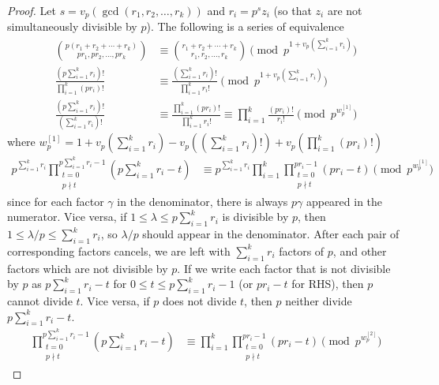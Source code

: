 \documentclass{treatise}
\begin{document}
\begin{proof}
Let $s = v_p (\gcd(r_1, r_2, \hdots, r_k))$ and $r_i = p^s z_i$ (so that $z_i$ are not simultaneously divisible by $p$). The following is a series of equivalence
\begin{align*}
{p(r_1 + r_2 + \cdots + r_k) \choose p r_1, p r_2, \hdots, p r_k} & \equiv {r_1 + r_2 + \cdots + r_k \choose r_1, r_2, \hdots, r_k} \pmod{p^{1 + v_p \left( \sum_{i = 1}^k r_i \right)}}
\\
\frac{\left( p \sum_{i = 1}^k r_i \right)!}{\prod_{i = 1}^k (pr_i)!} & \equiv \frac{\left( \sum_{i = 1}^k r_i \right)!}{\prod_{i = 1}^k r_i!} \pmod{p^{1 + v_p \left( \sum_{i = 1}^k r_i \right)}}
\\
\frac{\left( p \sum_{i = 1}^k r_i \right)!}{\left( \sum_{i = 1}^k r_i \right)!} & \equiv \frac{\prod_{i = 1}^k (pr_i)!}{\prod_{i = 1}^k r_i!} \equiv \prod_{i = 1}^k \frac{(pr_i)!}{r_i!} \pmod{p^{w_p^{[1]}}}
\end{align*}
where $w_p^{[1]} = 1 + v_p \left( \sum_{i = 1}^k r_i \right) - v_p \left( \left( \sum_{i = 1}^k r_i \right) ! \right) + v_p \left( \prod_{i = 1}^k (pr_i)! \right)$
\begin{align*}
p^{\sum_{i = 1}^k r_i} \prod_{\substack{t = 0 \\ p \nmid t}}^{p \sum_{i = 1}^k r_i - 1} \left( p \sum_{i = 1}^k r_i - t \right) & \equiv p^{\sum_{i = 1}^k r_i} \prod_{i = 1}^k \prod_{\substack{t = 0 \\ p \nmid t}}^{p r_i - 1} (p r_i - t) \pmod{p^{w_p^{[1]}}}
\end{align*}
since for each factor $\gamma$ in the denominator, there is always $p \gamma$ appeared in the numerator. Vice versa, if $1 \leq \lambda \leq p \sum_{i = 1}^k r_i$ is divisible by $p$, then $1 \leq \lambda/p \leq \sum_{i = 1}^k r_i$, so $\lambda/p$ should appear in the denominator. After each pair of corresponding factors cancels, we are left with $\sum_{i = 1}^k r_i$ factors of $p$, and other factors which are not divisible by $p$. If we write each factor that is not divisible by $p$ as $p \sum_{i = 1}^k r_i - t$ for $0 \leq t \leq p \sum_{i = 1}^k r_i - 1$ (or $pr_i - t$ for RHS), then $p$ cannot divide $t$. Vice versa, if $p$ does not divide $t$, then $p$ neither divide $p \sum_{i = 1}^k r_i - t$.
\begin{align*}
\prod_{\substack{t = 0 \\ p \nmid t}}^{p \sum_{i = 1}^k r_i - 1} \left( p \sum_{i = 1}^k r_i - t \right) & \equiv \prod_{i = 1}^k \prod_{\substack{t = 0 \\ p \nmid t}}^{p r_i - 1} (p r_i - t) \pmod{p^{w_p^{[2]}}}

\end{align*}
\end{proof}
\end{document}
